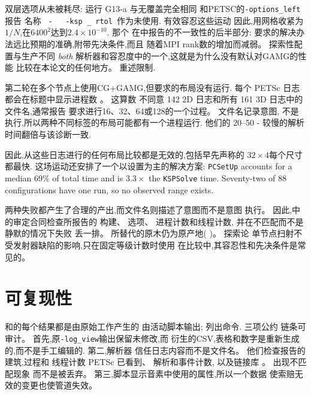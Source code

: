 \documentclass[11pt,a4paper,oneside]{report}
\begin{document}
双层选项从未被耗尽: 运行 G13-a 与无覆盖完全相同
和PETSC的\texttt{-options\_left}报告
名称 \texttt { - { } -ksp \_ rtol }作为未使用. 有效容忍这些运动
因此,用网格收紧为$1/N$,在$6400^2$达到$2.4\times10^{-10}$. 那个
在中报告的不一致性的后半部分:
要求的解决办法远比预期的准确,附带先决条件,而且
随着MPI rank数的增加而减弱。 探索性配置与生产不同
\emph{both} 解析器和容忍度中的一个,这就是为什么没有默认对GAMG的性能
比较在本论文的任何地方。 重述限制.

第二轮在多个节点上使用CG+GAMG,但要求的布局没有运行.
每个 PETSc 日志都会在标题中显示进程数 。 这算数
不同意 142 2D 日志和所有 161 3D 日志中的文件名,通常报告
要求进行16、32、64或128的一个过程。 文件名记录意图, 不是
执行,所以两种不同标签的布局可能都有一个进程运行. 他们的
20--50 - 较慢的解析时间翻倍与该诊断一致.

因此,从这些日志进行的任何布局比较都是无效的,包括早先声称的
$32\times4$每个尺寸都最快. 这场运动还安排了一个以设置为主的解决方案:
\texttt{PCSetUp} accounts for a median 69\% of total time and is $3.3\times$ the
\texttt{KSPSolve} time. Seventy-two of 88 configurations have one run, so no observed
range exists.

两种失败都产生了合理的产出,而文件名则描述了意图而不是意图
执行。 因此,中的审定合同检查所报告的
构建、 选项、 进程计数和线程计数, 并在不匹配而不是静默的情况下失败
丢一排。 所替代的原木仍为原产地( )。 探索论
单节点扫射不受发射器缺陷的影响,只在固定等级计数时使用
在比较中,其容忍性和先决条件是常见的。

\section{可复现性}
\label{sec:repro}
和的每个结果都是由原始工作产生的
由活动脚本输出;  列出命令. 三项公约
链条可审计。 首先,原\texttt{-log\_view}输出保留未修改,而
衍生的CSV,表格和数字是重新生成的,而不是手工编辑的. 第二,解析器
信任日志内容而不是文件名。 他们检查报告的建筑,过程和
线程计数 PETSc 已看到、 解析和事件计数, 以及链接库 。 出现不匹配现象
而不是被丢弃。 第三,脚本显示音素中使用的属性,所以一个数据
使索赔无效的变更也使管道失效。
\end{document}
